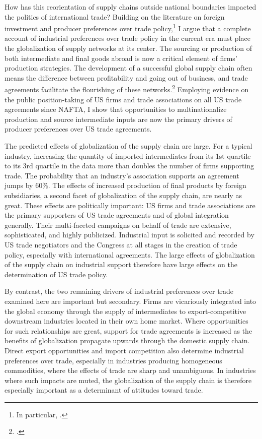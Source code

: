 \documentclass[hidelinks,12pt,letter]{article}
\begin{document}
How has this reorientation of supply chains outside national boundaries impacted the politics of international trade? 
Building on the literature on foreign investment and producer preferences over trade policy,\footnote{In particular, \citealt{milner1988resisting,manger2009investing}.} I argue that a complete account of industrial preferences over trade policy in the current era must place the globalization of supply networks at its center. The sourcing or production of both intermediate and final goods abroad is now a critical element of firms' production strategies. The development of a successful global supply chain often means the difference between profitability and going out of business, and trade agreements facilitate the flourishing of these networks.\footnote{\citealt{baccini2016distributional}.} Employing evidence on the public position-taking of US firms and trade associations on all US trade agreements since NAFTA, I show that opportunities to multinationalize production and source intermediate inputs are now the primary drivers of producer preferences over US trade agreements.

The predicted effects of globalization of the supply chain are large. For a typical industry, increasing the quantity of imported intermediates from its 1st quartile to its 3rd quartile in the data more than doubles the number of firms supporting trade. The probability that an industry's association supports an agreement jumps by 60\%. The effects of increased production of final products by foreign subsidiaries, a second facet of globalization of the supply chain, are nearly as great. %
These effects are politically important: US firms and trade associations are the primary supporters of US trade agreements and of global integration generally. Their multi-faceted campaigns on behalf of trade are extensive, sophisticated, and highly publicized. Industrial input is solicited and recorded by US trade negotiators and the Congress at all stages in the creation of trade policy, especially with international agreements. The large effects of globalization of the supply chain on industrial support therefore have large effects on the determination of US trade policy.

By contrast, the two remaining drivers of industrial preferences over trade examined here are important but secondary. Firms are vicariously integrated into the global economy through the supply of intermediates to export-competitive downstream industries located in their own home market. Where opportunities for such relationships are great, support for trade agreements is increased as the benefits of globalization propagate upwards through the domestic supply chain. Direct export opportunities and import competition also determine industrial preferences over trade, especially in industries producing homogeneous commodities, where the effects of trade are sharp and unambiguous. In industries where such impacts are muted, the globalization of the supply chain is therefore especially important as a determinant of attitudes toward trade.
\end{document}
